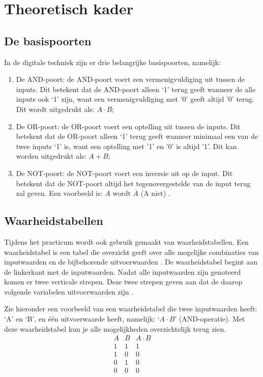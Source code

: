 \documentclass[12pt]{article}
\begin{document}
\section{Theoretisch kader}
\label{Theoretisch kader}
\subsection{De basispoorten}
In de digitale techniek zijn er drie belangrijke basispoorten, namelijk:
\begin{enumerate}
    \item De AND-poort: de AND-poort voert een vermenigvuldiging uit tussen de inputs. Dit betekent dat de AND-poort alleen `1' terug geeft wanneer de alle inputs ook `1' zijn, want een vermenigvuldiging met '0' geeft altijd '0' terug. Dit wordt uitgedrukt als: $A \cdot B$;
    \item De OR-poort: de OR-poort voert een optelling uit tussen de inputs. Dit betekent dat de OR-poort alleen `1' terug geeft wanneer minimaal een van de twee inputs `1' is, want een optelling met '1' en '0' is altijd '1'. Dit kan worden uitgedrukt als: $A + B$;
    \item De NOT-poort: de NOT-poort voert een inversie uit op de input. Dit betekent dat de NOT-poort altijd het tegenovergestelde van de input terug zal geven. Een voorbeeld is: $A$ wordt $\overline{A}$ (A niet) \cite{electricalengineering123}.
\end{enumerate}
\subsection{Waarheidstabellen}
Tijdens het practicum wordt ook gebruik gemaakt van waarheidstabellen. 
Een waarheidstabel is een tabel die overzicht geeft over alle mogelijke combinaties van inputwaarden en de bijbehorende uitvoerwaarden \cite{truth2}. 
De waarheidstabel begint aan de linkerkant met de inputwaarden. 
Nadat alle inputwaarden zijn genoteerd komen er twee verticale strepen. 
Deze twee strepen geven aan dat de daarop volgende variabelen uitvoerwaarden zijn \cite{truth1}.  

Zie hieronder een voorbeeld van een waarheidstabel die twee inputwaarden heeft: `A' en `B', en één uitvoerwaarde heeft, namelijk: `$A \cdot B$' (AND-operatie). 
Met deze waarheidstabel kun je alle mogelijkheden overzichtelijk terug zien.
\begin{displaymath}
    \begin{array}{|c|c||c|}
    A & B & A \cdot B \\
    \hline 
    1 & 1 & 1 \\
    1 & 0 & 0 \\
    0 & 1 & 0 \\
    0 & 0 & 0
    \end{array}
    \end{displaymath}
\pagebreak
\end{document}

